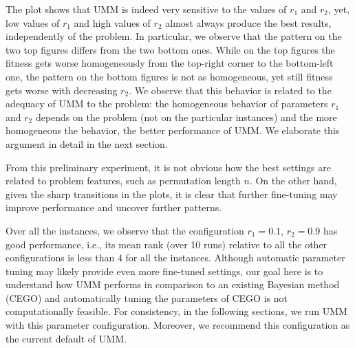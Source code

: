 \documentclass[sigconf,dvipsnames]{acmart}
\begin{document}
The plot shows that UMM is indeed very sensitive to the values of $r_1$ and
$r_2$, yet, low values of $r_1$ and high values of $r_2$ almost always produce
the best results, independently of the problem.  In particular, we observe that
the pattern on the two top figures differs from the two bottom ones. While on
the top figures the fitness gets worse homogeneously from the top-right corner
to the bottom-left one, the pattern on the bottom figures is not as homogeneous, yet
still fitness gets worse with decreasing $r_2$.  We observe that this behavior
is related to the adequacy of UMM to the problem: the homogeneous behavior of
parameters $r_1$ and $r_2$ depends on the problem (not on the particular
instances) and the more homogeneous the behavior, the better performance of
UMM. We elaborate this argument in detail in the next section.

From this preliminary experiment, it is not obvious how the best settings are
related to problem features, such as permutation length $n$. On the other
hand, given the sharp transitions in the plots, it is clear that further
fine-tuning may improve performance and uncover further patterns.

Over all the instances, we observe that the configuration $r_1 =0.1$, $r_2=0.9$
has good performance, i.e., its mean rank (over 10 runs) relative to all the
other configurations is less than 4 for all the instances.  Although automatic
parameter tuning may likely provide even more fine-tuned settings, our goal
here is to understand how UMM performs in comparison to an existing Bayesian
method (CEGO) and automatically tuning the parameters of CEGO is not
computationally feasible.  For consistency, in the following sections, we run
UMM with this parameter configuration.  Moreover, we recommend this
configuration as the current default of UMM.
\end{document}

